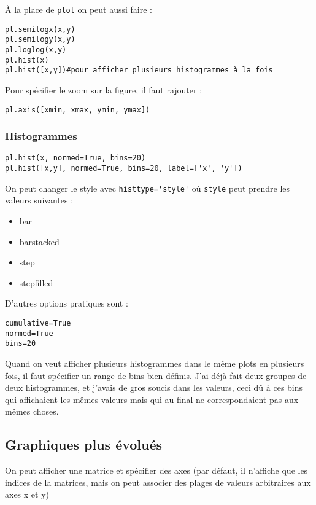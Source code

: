 \documentclass[a4paper,twoside]{article}
\begin{document}
À la place de \verb|plot| on peut aussi faire :
\begin{verbatim}
pl.semilogx(x,y)
pl.semilogy(x,y)
pl.loglog(x,y)
pl.hist(x)
pl.hist([x,y])#pour afficher plusieurs histogrammes à la fois
\end{verbatim}

Pour spécifier le zoom sur la figure, il faut rajouter :
\begin{verbatim}
pl.axis([xmin, xmax, ymin, ymax])
\end{verbatim}

\subsubsection{Histogrammes}
\begin{verbatim}
pl.hist(x, normed=True, bins=20)
pl.hist([x,y], normed=True, bins=20, label=['x', 'y'])
\end{verbatim}

On peut changer le style avec \verb|histtype='style'| où \verb|style| peut prendre les valeurs suivantes :
\begin{itemize}
\item bar
\item barstacked
\item step
\item stepfilled
\end{itemize}

D'autres options pratiques sont :
\begin{verbatim}
cumulative=True
normed=True
bins=20
\end{verbatim}

\begin{attention}
Quand on veut afficher plusieurs histogrammes dans le même plots en plusieurs fois, il faut spécifier un range de bins bien définis. J'ai déjà fait deux groupes de deux histogrammes, et j'avais de gros soucis dans les valeurs, ceci dû à ces bins qui affichaient les mêmes valeurs mais qui au final ne correspondaient pas aux mêmes choses.
\end{attention}


\subsection{Graphiques plus évolués}
On peut afficher une matrice et spécifier des axes (par défaut, il n'affiche que les indices de la matrices, mais on peut associer des plages de valeurs arbitraires aux axes x et y)
\end{document}

